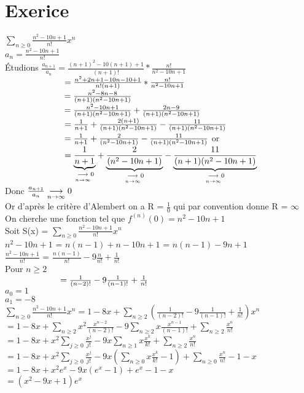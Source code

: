 \documentclass{article}
\author{Frederic Becerril}
\newcommand\tab[1][1cm]{\hspace*{#1}}
\begin{document}
\part*{Exerice}

$\sum_{n \geq 0} \frac{n^2 - 10n + 1}{n!}x^n$\\
$a_n = \frac{n^2 - 10n + 1}{n!}$\\
Étudions $\frac{a_{n+1}}{a_n} = \frac{(n + 1)^2 - 10(n + 1) + 1}{(n + 1)!} * \frac{n!}{n^2 - 10n + 1}$\\
$\tab[2.42cm] = \frac{n^2 + 2n + 1 -10n -10 + 1}{n!(n+1)} * \frac{n!}{n^2 - 10n + 1}$\\
$\tab[2.42cm] = \frac{n^2 -8n -8}{(n + 1)(n^2 - 10n + 1)}$\\
$\tab[2.42cm] = \frac{n^2 -10n + 1}{(n + 1)(n^2 - 10n + 1)} + \frac{2n - 9}{(n + 1)(n^2 - 10n + 1)}$\\
$\tab[2.42cm] = \frac{1}{n + 1} + \frac{2(n + 1)}{(n + 1)(n^2 - 10n + 1)} - \frac{11}{(n + 1)(n^2 - 10n + 1)}$\\
$\tab[2.42cm] = \frac{1}{n + 1} + \frac{2}{(n^2 - 10n + 1)} - \frac{11}{(n + 1)(n^2 - 10n + 1)}$ or \\
$\tab[2.42cm] = \underset{\mylim 0}{\underbrace{\frac{1}{n + 1}}}
+ \underset{\mylim 0}{\underbrace{\frac{2}{(n^2 - 10n + 1)}}}
- \underset{\mylim 0}{\underbrace{\frac{11}{(n + 1)(n^2 - 10n + 1)}}}$\\
Donc $\frac{a_{n+1}}{a_n} \mylim 0$\\
Or d'après le critère d'Alembert on a R = $\frac{1}{0}$ qui par convention donne R = $\infty$ \\
On cherche une fonction tel que $f^{(n)}(0) = n^2 -10n + 1$\\
Soit S(x) = $\sum_{n \geq 0} \frac{n^2 - 10n + 1}{n!}x^n$\\
$n^2 -10n + 1$ = $n(n-1) + n - 10n + 1$ = $n(n -1) - 9n + 1$\\
$\frac{n^2 -10n + 1}{n!}$ = $\frac{n(n-1)}{n!} - 9\frac{n}{n!} + \frac{1}{n!}$\\
Pour $n \geq 2$\\
$\tab[2.25cm] = \frac{1}{(n-2)!} - 9\frac{1}{(n-1)!} + \frac{1}{n!}$\\
$a_0 = 1$\\
$a_1 = -8$\\
$\sum_{n \geq 0} \frac{n^2 - 10n + 1}{n!}x^n = 1 - 8x + \sum_{n \geq 2} (\frac{1}{(n-2)!} - 9\frac{1}{(n-1)!} + \frac{1}{n!})x^n$\\
$=1 - 8x + \sum_{n \geq 2} x^2 \frac{x^{n-2}}{(n-2)!} - 9\sum_{n \geq 2} x\frac{x^{n-1}}{(n-1)!} + \sum_{n \geq 2} \frac{x^n}{n!}$\\
$=1 - 8x + x^2\sum_{j \geq 0} \frac{x^{j}}{j!} - 9x\sum_{n \geq 1} x\frac{x^{k}}{k!} + \sum_{n \geq 2} \frac{x^n}{n!}$\\
$=1 - 8x + x^2\sum_{j \geq 0} \frac{x^{j}}{j!} - 9x(\sum_{n \geq 0} x\frac{x^{k}}{k!} -1) + \sum_{n \geq 0} \frac{x^n}{n!} -1 -x$\\
$=1 - 8x + x^2 e^x -9x (e^x -1) + e^x -1 -x$\\
$=(x^2 -9x + 1)e^x$\\
\end{document}
